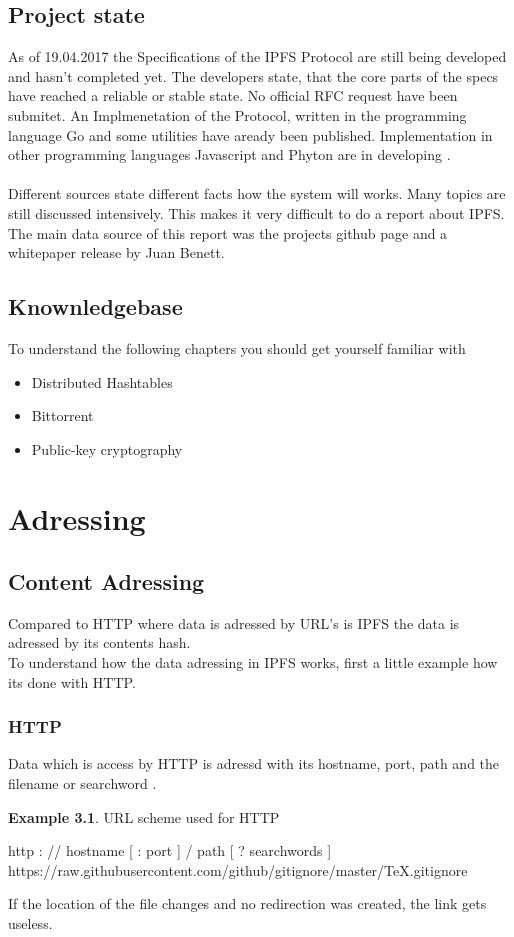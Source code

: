 \documentclass[a4paper,11pt, oneside]{report}
\theoremstyle{definition}
\newtheorem{exmp}{Example}[subsection]
\begin{document}
\section{Project state}
As of 19.04.2017 the Specifications of the IPFS Protocol are still being developed and hasn't completed yet. The developers state, that the
core parts of the specs have reached a reliable or stable state. No official RFC request have been submitet. An Implmenetation of the Protocol, written in the programming language Go and some utilities have aready been published. Implementation in other programming languages Javascript and Phyton are in developing \cite{specs}.\\ \\
Different sources state different facts how the system will works. Many topics are still discussed intensively. This makes it very difficult to do a report about IPFS. The main data source of this report was the projects github page and a whitepaper release by Juan Benett.

\section{Knownledgebase}
To understand the following chapters you should get yourself familiar with
\begin{itemize}
\item Distributed Hashtables
\item Bittorrent
\item Public-key cryptography 
\end{itemize}

\newpage
 
\chapter{Adressing}
\section{Content Adressing}
Compared to HTTP where data is adressed by URL's is IPFS the data is adressed by its contents hash.\\
To understand how the data adressing in IPFS works, first a little example how its done with HTTP.
\subsection{HTTP}
Data which is access by HTTP is adressd with its hostname, port, path and the filename or searchword \cite{HTTPAdressing}.
\begin{exmp} URL scheme used for HTTP
\noindent
\begin{center}
http : // hostname [ : port ] / path [ ? searchwords ]\\
https://raw.githubusercontent.com/github/gitignore/master/TeX.gitignore
\end{center}
\end{exmp}
\noindent
If the location of the file changes and no redirection was created, the link gets useless.
\noindent
\newpage
\end{document}

